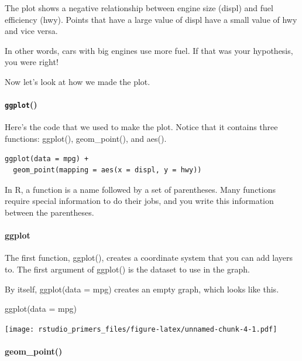 \documentclass[
]{article}
\newenvironment{Shaded}{\begin{snugshade}}{\end{snugshade}}
\newcommand{\AttributeTok}[1]{\textcolor[rgb]{0.77,0.63,0.00}{#1}}
\newcommand{\FunctionTok}[1]{\textcolor[rgb]{0.00,0.00,0.00}{#1}}
\newcommand{\NormalTok}[1]{#1}
\begin{document}
The plot shows a negative relationship between engine size (displ) and
fuel efficiency (hwy). Points that have a large value of displ have a
small value of hwy and vice versa.

In other words, cars with big engines use more fuel. If that was your
hypothesis, you were right!

Now let's look at how we made the plot.

\hypertarget{ggplot}{%
\paragraph{\texorpdfstring{\texttt{ggplot}()}{ggplot()}}\label{ggplot}}

Here's the code that we used to make the plot. Notice that it contains
three functions: ggplot(), geom\_point(), and aes().

\begin{verbatim}
ggplot(data = mpg) + 
  geom_point(mapping = aes(x = displ, y = hwy))
\end{verbatim}

In R, a function is a name followed by a set of parentheses. Many
functions require special information to do their jobs, and you write
this information between the parentheses.

\hypertarget{ggplot-1}{%
\paragraph{ggplot}\label{ggplot-1}}

The first function, ggplot(), creates a coordinate system that you can
add layers to. The first argument of ggplot() is the dataset to use in
the graph.

By itself, ggplot(data = mpg) creates an empty graph, which looks like
this.

\begin{Shaded}
\begin{Highlighting}[]
\FunctionTok{ggplot}\NormalTok{(}\AttributeTok{data =}\NormalTok{ mpg)}
\end{Highlighting}
\end{Shaded}

\texttt{[image: rstudio\_primers\_files/figure-latex/unnamed-chunk-4-1.pdf]}

\hypertarget{geom_point}{%
\paragraph{geom\_point()}\label{geom_point}}
\end{document}
